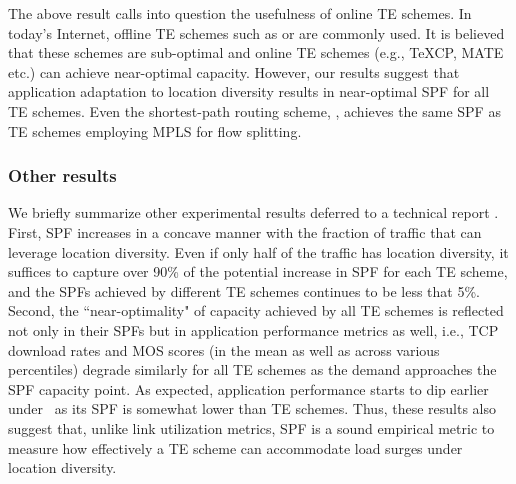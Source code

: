 The above result calls into question the usefulness of online TE schemes. In today's Internet, offline TE schemes such as \optwt{} or \mplsavg{} are commonly used. It is believed that these schemes are sub-optimal and online TE schemes (e.g., TeXCP, MATE etc.) can achieve near-optimal capacity.  However, our results suggest that application adaptation to location diversity results in near-optimal SPF for all TE schemes.  Even the shortest-path routing scheme, \optwt{}, achieves the same SPF as TE schemes employing MPLS for flow splitting.








\subsubsection{Other results}
We briefly summarize other experimental results deferred to a technical report \cite{TR}. First, SPF increases in a concave manner with the fraction of traffic that can leverage location diversity. Even if only half of the traffic has location diversity, it suffices to capture over 90\% of the potential increase in SPF for each TE scheme, and the SPFs achieved by different TE schemes continues to be less that 5\%. Second, the ``near-optimality" of capacity  achieved by all TE schemes is reflected not only in their SPFs but in application performance metrics as well, i.e., TCP download rates and MOS scores (in the mean as well as across various percentiles) degrade similarly for all TE schemes as the demand approaches the SPF capacity point. As expected, application performance starts to dip earlier under \invcap\ as its SPF is somewhat lower than TE schemes. Thus, these results also suggest that, unlike link utilization metrics, SPF is a sound empirical metric to measure how effectively a TE scheme can accommodate load surges under location diversity.
 

